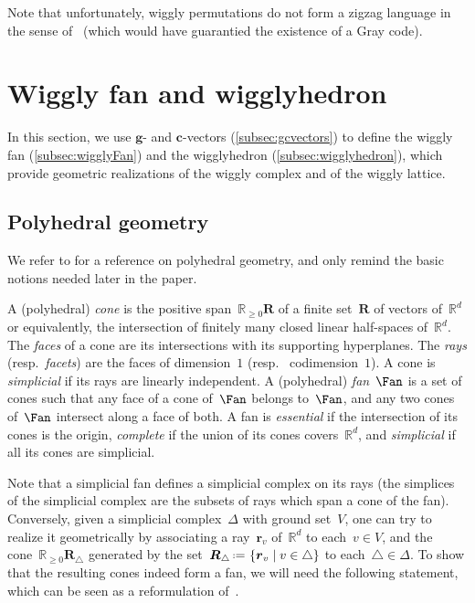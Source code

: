 \documentclass{amsart}
\theoremstyle{definition}
\newcommand{\R}{\mathbb{R}} %
\renewcommand{\b}[1]{{\boldsymbol{#1}}} %
\newcommand{\set}[2]{\left\{ #1 \;\middle|\; #2 \right\}} %
\newcommand{\eqdef}{\mbox{\,\raisebox{0.2ex}{\scriptsize\ensuremath{\mathrm:}}\ensuremath{=}\,}} %
\newcommand{\darkblue}{\color{darkblue}} %
\newcommand{\defn}[1]{\textsl{\darkblue #1}} %
\begin{document}
Note that unfortunately, wiggly permutations do not form a zigzag language in the sense of~\cite{HartungHoangMutzeWilliams} (which would have guarantied the existence of a Gray code).


\pagebreak
\section{Wiggly fan and wigglyhedron}
\label{sec:geometry}

In this section, we use $\b{g}$- and $\b{c}$-vectors (\cref{subsec:gcvectors}) to define the wiggly fan (\cref{subsec:wigglyFan}) and the wigglyhedron (\cref{subsec:wigglyhedron}), which provide geometric realizations of the wiggly complex and of the wiggly lattice.


\subsection{Polyhedral geometry}
\label{subsec:polyhedralGeometry}

We refer to \cite{Ziegler-polytopes} for a reference on polyhedral geometry, and only remind the basic notions needed later in the paper.

A (polyhedral) \defn{cone} is the positive span~$\R_{\ge 0}\b{R}$ of a finite set~$\b{R}$ of vectors of~$\R^d$ or equivalently, the intersection of finitely many closed linear half-spaces of~$\R^d.$ 
The \defn{faces} of a cone are its intersections with its supporting hyperplanes. 
The \defn{rays} (resp.~\defn{facets}) are the faces of dimension~$1$ (resp.~ codimension~$1$).
A cone is \defn{simplicial} if its rays are linearly independent.
A (polyhedral) \defn{fan}~$\Fan$ is a set of cones such that any face of a cone of~$\Fan$ belongs to~$\Fan$, and any two cones of~$\Fan$ intersect along a face of both. 
A fan is \defn{essential} if the intersection of its cones is the origin, \defn{complete} if the union of its cones covers~$\R^d$, and \defn{simplicial} if all its cones are simplicial.

Note that a simplicial fan defines a simplicial complex on its rays (the simplices of the simplicial complex are the subsets of rays which span a cone of the fan).
Conversely, given a simplicial complex~$\Delta$ with ground set~$V$, one can try to realize it geometrically by associating a ray~$\b{r}_v$ of~$\R^d$ to each~$v \in V$, and the cone~$\R_{\ge 0}\b{R}_\triangle$ generated by the set~$\b{R}_\triangle \eqdef \set{\b{r}_v}{v \in \triangle}$ to each~$\triangle \in \Delta$.
To show that the resulting cones indeed form a fan, we will need the following statement, which can be seen as a reformulation of~\cite[Coro.~4.5.20]{DeLoeraRambauSantos}.
\end{document}

